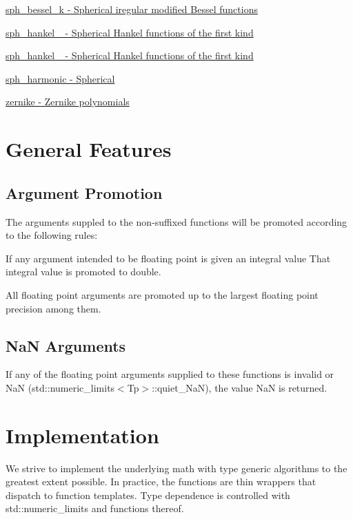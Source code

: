 \begin{DoxyItemize}
\item \hyperlink{group__gnu__math__spec__func_ga737e6fe2f7f4acb6fcc6bccfe2a4c254}{sph\+\_\+bessel\+\_\+k -\/ Spherical iregular modified Bessel functions}
\item \hyperlink{group__gnu__math__spec__func_ga9440f3f92ebc56bd77d64853390247f6}{sph\+\_\+hankel\+\_ -\/ Spherical Hankel functions of the first kind}
\item \hyperlink{group__gnu__math__spec__func_ga4f112ebd12bfbea7f0eea9275a1209ac}{sph\+\_\+hankel\+\_ -\/ Spherical Hankel functions of the first kind}
\item \hyperlink{group__gnu__math__spec__func_ga28f1390a0366bc8c9780918d9720146b}{sph\+\_\+harmonic -\/ Spherical}
\item \hyperlink{group__gnu__math__spec__func_gac43d89238752ed88927867236ab8c6a8}{zernike -\/ Zernike polynomials}
\end{DoxyItemize}\hypertarget{index_general}{}\section{General Features}\label{index_general}
\hypertarget{index_promotion}{}\subsection{Argument Promotion}\label{index_promotion}
The arguments suppled to the non-\/suffixed functions will be promoted according to the following rules\+:
\begin{DoxyEnumerate}
\item If any argument intended to be floating point is given an integral value That integral value is promoted to double.
\item All floating point arguments are promoted up to the largest floating point precision among them.
\end{DoxyEnumerate}\hypertarget{index_NaN}{}\subsection{Na\+N Arguments}\label{index_NaN}
If any of the floating point arguments supplied to these functions is invalid or NaN (std\+::numeric\+\_\+limits$<$\+Tp$>$\+::quiet\+\_\+\+NaN), the value NaN is returned.\hypertarget{index_impl}{}\section{Implementation}\label{index_impl}
We strive to implement the underlying math with type generic algorithms to the greatest extent possible. In practice, the functions are thin wrappers that dispatch to function templates. Type dependence is controlled with std\+::numeric\+\_\+limits and functions thereof.

